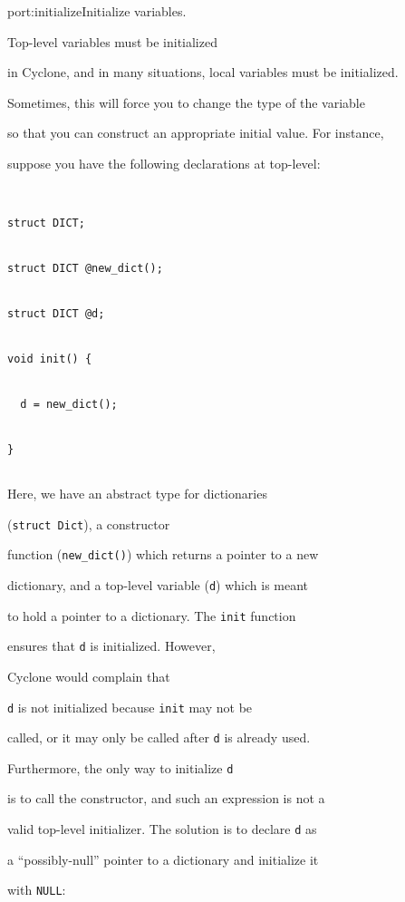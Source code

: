 \begin{porta}{port:initialize}{Initialize variables.}  





Top-level variables must be initialized


in Cyclone, and in many situations, local variables must be initialized.


Sometimes, this will force you to change the type of the variable


so that you can construct an appropriate initial value.  For instance,


suppose you have the following declarations at top-level:


\begin{verbatim}


struct DICT; 


struct DICT @new_dict();


struct DICT @d;


void init() {


  d = new_dict();


}


\end{verbatim}


Here, we have an abstract type for dictionaries 


(\texttt{struct Dict}), a constructor


function (\texttt{new\_dict()}) which returns a pointer to a new


dictionary, and a top-level variable (\texttt{d}) which is meant


to hold a pointer to a dictionary.  The \texttt{init} function


ensures that \texttt{d} is initialized.  However, 


Cyclone would complain that 


\texttt{d} is not initialized because \texttt{init} may not be


called, or it may only be called after \texttt{d} is already used.  


Furthermore, the only way to initialize \texttt{d}


is to call the constructor, and such an expression is not a 


valid top-level initializer.  The solution is to declare \texttt{d} as


a ``possibly-null'' pointer to a dictionary and initialize it


with \texttt{NULL}:



\end{porta}
